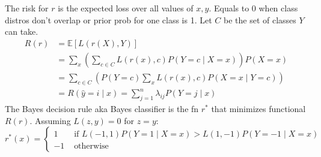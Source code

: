 \documentclass[10pt,landscape]{article}
\newcommand{\wrap}[3]{\left#1#3\right#2}
\def\E{\mathbb{E}}
\begin{document}
\begin{multicols}{3}
The risk for $r$ is the expected loss over all values of $x, y$. Equals to 0 when class distros don't overlap or prior prob for one class is 1. Let $C$ be the set of classes $Y$ can take.
{
  \begin{align*}
    R(r) &=\E[L(r(X), Y)] \\
    &=\sum_{x}\wrap(){\sum_{c\in C} L(r(x), c) P(Y=c \mid X=x)} P(X=x) \\
    &=\sum_{c\in C}\wrap(){ P(Y=c) \sum_{x} L(r(x), c) P(X=x \mid Y=c)} \\
    &= R(\hat{y}=i \mid x)=\sum_{j=1}^{n} \lambda_{i j} P(Y=j \mid x)
  \end{align*}
}
The Bayes decision rule aka Bayes classifier is the fn $r^{*}$ that minimizes functional $R(r)$. Assuming $L(z, y)=0$ for $z=y$:
{\scriptsize \[
r^{*}(x)=\left\{\begin{aligned}
1 & \text { if } L(-1,1) P(Y=1 \mid X=x)>L(1,-1) P(Y=-1 \mid X=x) \\
-1 & \text { otherwise }
\end{aligned}\right.
\]}

\end{multicols}
\end{document}
